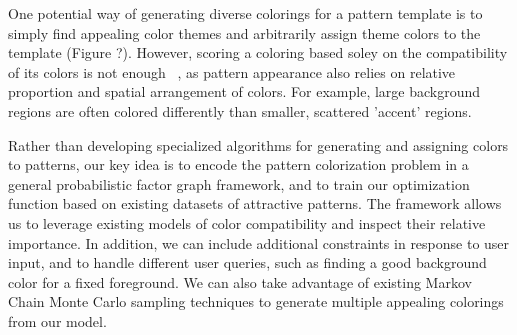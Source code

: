 One potential way of generating diverse colorings for a pattern template is to simply find appealing color themes and arbitrarily assign theme colors to the template (Figure ?). However, scoring a coloring based soley on the compatibility of its colors is not enough ~\cite{ColorPaletteTools}, as pattern appearance also relies on relative proportion and spatial arrangement of colors. For example, large background regions are often colored differently than smaller, scattered 'accent' regions. 


Rather than developing specialized algorithms for generating and assigning colors to patterns, our key idea is to encode the pattern colorization problem in a general probabilistic factor graph framework, and to train our optimization function based on existing datasets of attractive patterns. The framework allows us to leverage existing models of color compatibility and inspect their relative importance. In addition, we can include additional constraints in response to user input, and to handle different user queries, such as finding a good background color for a fixed foreground. We can also take advantage of existing Markov Chain Monte Carlo sampling techniques to generate multiple appealing colorings from our model.



